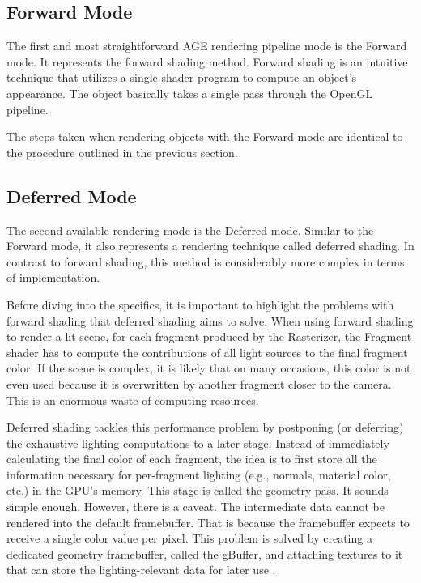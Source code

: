 \documentclass[
  digital,     %
  oneside,     %
  nosansbold,  %
  nocolorbold, %
  lof,         %
  lot,         %
]{fithesis4}
\begin{document}
\subsection{Forward Mode}
The first and most straightforward AGE rendering pipeline mode is the Forward mode. It represents the forward shading method.
Forward shading is an intuitive technique that utilizes a single
shader program to compute an object's appearance. The object basically takes a single pass through the OpenGL pipeline.

The steps taken when rendering objects with the Forward mode are identical to the procedure outlined
in the previous section.

\subsection{Deferred Mode}
The second available rendering mode is the Deferred mode. Similar to the Forward mode, it also represents
a rendering technique called deferred shading. In contrast to forward shading, this method is considerably
more complex in terms of implementation.

Before diving into the specifics, it is important to highlight the problems with forward shading
that deferred shading aims to solve. When using forward shading to render a lit scene,
for each fragment produced by the Rasterizer, the Fragment shader has to compute the contributions
of all light sources to the final fragment color. If the scene is complex, it is likely that on many occasions,
this color is not even used because it is overwritten by another fragment closer to the camera.
This is an enormous waste of computing resources.

Deferred shading tackles this performance problem by postponing (or deferring) the exhaustive lighting computations to a later stage.
Instead of immediately calculating the final color of each fragment,
the idea is to first store all the information necessary for per-fragment lighting
(e.g., normals, material color, etc.) in the GPU's memory. This stage is called the geometry pass. It sounds
simple enough. However, there is a caveat. The intermediate data cannot be rendered into the default framebuffer.
That is because the framebuffer expects to receive a single color value per pixel.
This problem is solved by creating a dedicated geometry framebuffer, called the gBuffer, and attaching textures to it
that can store the lighting-relevant data for later use \cite{learnopengl-deferred}.
\end{document}
